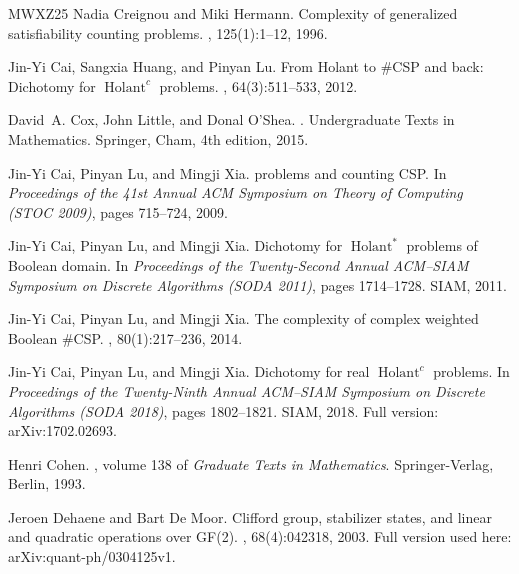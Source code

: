 \documentclass[11pt,letterpaper,onecolumn]{article}
\theoremstyle{plain}
\theoremstyle{definition}
\theoremstyle{remark}
\begin{document}
\begin{thebibliography}{MWXZ25}
Nadia Creignou and Miki Hermann.
\newblock Complexity of generalized satisfiability counting problems.
, 125(1):1--12, 1996.

Jin-Yi Cai, Sangxia Huang, and Pinyan Lu.
\newblock From {Holant} to {\#}{CSP} and back: Dichotomy for
  {$\operatorname{Holant}^{c}$} problems.
, 64(3):511--533, 2012.

David~A. Cox, John Little, and Donal O'Shea.
.
\newblock Undergraduate Texts in Mathematics. Springer, Cham, 4th edition,
  2015.

Jin-Yi Cai, Pinyan Lu, and Mingji Xia.
 problems and counting {CSP}.
\newblock In {\em Proceedings of the 41st Annual ACM Symposium on Theory of
  Computing (STOC 2009)}, pages 715--724, 2009.

Jin-Yi Cai, Pinyan Lu, and Mingji Xia.
\newblock Dichotomy for {$\operatorname{Holant}^{*}$} problems of {Boolean}
  domain.
\newblock In {\em Proceedings of the Twenty-Second Annual ACM--SIAM Symposium
  on Discrete Algorithms (SODA 2011)}, pages 1714--1728. SIAM, 2011.

Jin-Yi Cai, Pinyan Lu, and Mingji Xia.
\newblock The complexity of complex weighted {Boolean} {{\#CSP}}.
, 80(1):217--236, 2014.

Jin-Yi Cai, Pinyan Lu, and Mingji Xia.
\newblock Dichotomy for real {$\operatorname{Holant}^{c}$} problems.
\newblock In {\em Proceedings of the Twenty-Ninth Annual ACM--SIAM Symposium on
  Discrete Algorithms (SODA 2018)}, pages 1802--1821. SIAM, 2018.
\newblock Full version: arXiv:1702.02693.

Henri Cohen.
, volume 138
  of {\em Graduate Texts in Mathematics}.
\newblock Springer-Verlag, Berlin, 1993.

Jeroen Dehaene and Bart {De Moor}.
\newblock Clifford group, stabilizer states, and linear and quadratic
  operations over {GF}(2).
, 68(4):042318, 2003.
\newblock Full version used here: arXiv:quant-ph/0304125v1.


\end{thebibliography}
\end{document}
